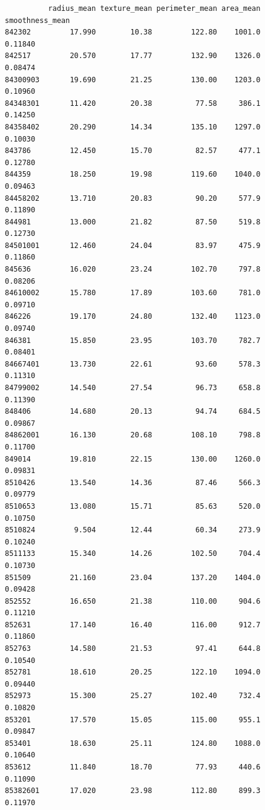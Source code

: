 \documentclass[
  letterpaper,
  DIV=11,
  numbers=noendperiod]{scrartcl}
\begin{document}
\begin{verbatim}
          radius_mean texture_mean perimeter_mean area_mean smoothness_mean
842302         17.990        10.38         122.80    1001.0         0.11840
842517         20.570        17.77         132.90    1326.0         0.08474
84300903       19.690        21.25         130.00    1203.0         0.10960
84348301       11.420        20.38          77.58     386.1         0.14250
84358402       20.290        14.34         135.10    1297.0         0.10030
843786         12.450        15.70          82.57     477.1         0.12780
844359         18.250        19.98         119.60    1040.0         0.09463
84458202       13.710        20.83          90.20     577.9         0.11890
844981         13.000        21.82          87.50     519.8         0.12730
84501001       12.460        24.04          83.97     475.9         0.11860
845636         16.020        23.24         102.70     797.8         0.08206
84610002       15.780        17.89         103.60     781.0         0.09710
846226         19.170        24.80         132.40    1123.0         0.09740
846381         15.850        23.95         103.70     782.7         0.08401
84667401       13.730        22.61          93.60     578.3         0.11310
84799002       14.540        27.54          96.73     658.8         0.11390
848406         14.680        20.13          94.74     684.5         0.09867
84862001       16.130        20.68         108.10     798.8         0.11700
849014         19.810        22.15         130.00    1260.0         0.09831
8510426        13.540        14.36          87.46     566.3         0.09779
8510653        13.080        15.71          85.63     520.0         0.10750
8510824         9.504        12.44          60.34     273.9         0.10240
8511133        15.340        14.26         102.50     704.4         0.10730
851509         21.160        23.04         137.20    1404.0         0.09428
852552         16.650        21.38         110.00     904.6         0.11210
852631         17.140        16.40         116.00     912.7         0.11860
852763         14.580        21.53          97.41     644.8         0.10540
852781         18.610        20.25         122.10    1094.0         0.09440
852973         15.300        25.27         102.40     732.4         0.10820
853201         17.570        15.05         115.00     955.1         0.09847
853401         18.630        25.11         124.80    1088.0         0.10640
853612         11.840        18.70          77.93     440.6         0.11090
85382601       17.020        23.98         112.80     899.3         0.11970

\end{verbatim}
\end{document}
